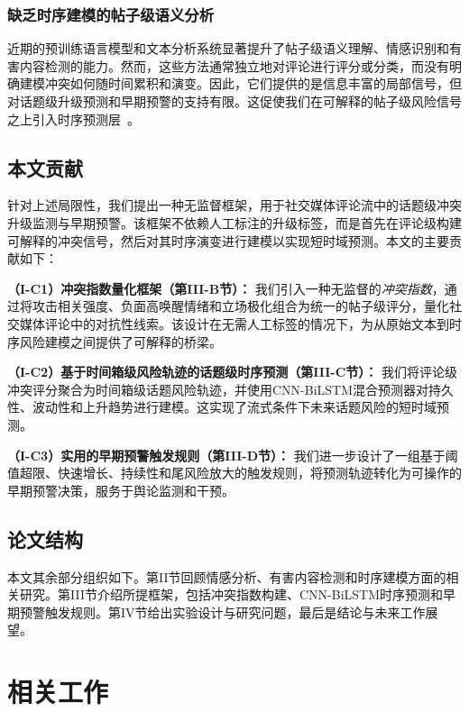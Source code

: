 \documentclass[conference]{IEEEtran}
\begin{document}
\subsubsection{缺乏时序建模的帖子级语义分析}

近期的预训练语言模型和文本分析系统显著提升了帖子级语义理解、情感识别和有害内容检测的能力。然而，这些方法通常独立地对评论进行评分或分类，而没有明确建模冲突如何随时间累积和演变。因此，它们提供的是信息丰富的局部信号，但对话题级升级预测和早期预警的支持有限。这促使我们在可解释的帖子级风险信号之上引入时序预测层~\cite{Abdalgader2025}。

\subsection{本文贡献}

针对上述局限性，我们提出一种无监督框架，用于社交媒体评论流中的话题级冲突升级监测与早期预警。该框架不依赖人工标注的升级标签，而是首先在评论级构建可解释的冲突信号，然后对其时序演变进行建模以实现短时域预测。本文的主要贡献如下：

\noindent\textbf{（I-C1）冲突指数量化框架（第III-B节）：}
我们引入一种无监督的\emph{冲突指数}，通过将攻击相关强度、负面高唤醒情绪和立场极化组合为统一的帖子级评分，量化社交媒体评论中的对抗性线索。该设计在无需人工标签的情况下，为从原始文本到时序风险建模之间提供了可解释的桥梁。

\noindent\textbf{（I-C2）基于时间箱级风险轨迹的话题级时序预测（第III-C节）：}
我们将评论级冲突评分聚合为时间箱级话题风险轨迹，并使用CNN-BiLSTM混合预测器对持久性、波动性和上升趋势进行建模。这实现了流式条件下未来话题风险的短时域预测。

\noindent\textbf{（I-C3）实用的早期预警触发规则（第III-D节）：}
我们进一步设计了一组基于阈值超限、快速增长、持续性和尾风险放大的触发规则，将预测轨迹转化为可操作的早期预警决策，服务于舆论监测和干预。

\subsection{论文结构}

本文其余部分组织如下。第II节回顾情感分析、有害内容检测和时序建模方面的相关研究。第III节介绍所提框架，包括冲突指数构建、CNN-BiLSTM时序预测和早期预警触发规则。第IV节给出实验设计与研究问题，最后是结论与未来工作展望。

\section{相关工作}
\end{document}
